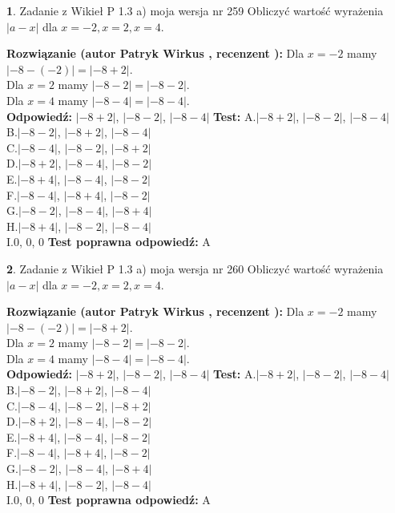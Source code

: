 \documentclass[12pt, a4paper]{article}
\theoremstyle{definition} %
\newtheorem{zad}{}
\newcommand{\zadStart}[1]{\begin{zad}#1\newline}
\newcommand{\zadStop}{\end{zad}}
\newcommand{\rozwStart}[2]{\noindent \textbf{Rozwiązanie (autor #1 , recenzent #2): }\newline}
\newcommand{\rozwStop}{\newline}
\newcommand{\odpStart}{\noindent \textbf{Odpowiedź:}\newline}
\newcommand{\odpStop}{\newline}
\newcommand{\testStart}{\noindent \textbf{Test:}\newline}
\newcommand{\testStop}{\newline}
\newcommand{\kluczStart}{\noindent \textbf{Test poprawna odpowiedź:}\newline}
\newcommand{\kluczStop}{\newline}
\begin{document}
\zadStart{Zadanie z Wikieł P 1.3 a) moja wersja nr 259}
Obliczyć wartość wyrażenia $|a - x|$ dla $x=-2,x=2,x=4$.
\zadStop
\rozwStart{Patryk Wirkus}{}
Dla $x = -2$ mamy $|-8 - (-2)| = |-8 + 2|$.\\
Dla $x = 2$ mamy $|-8 - 2| = |-8 - 2|$.\\
Dla $x = 4$ mamy $|-8 - 4| = |-8 - 4|$.\\
\rozwStop
\odpStart
$|-8 + 2|$, $|-8 - 2|$, $|-8 - 4|$
\odpStop
\testStart
A.$|-8 + 2|$, $|-8 - 2|$, $|-8 - 4|$\\
B.$|-8 - 2|$, $|-8 + 2|$, $|-8 - 4|$\\
C.$|-8 - 4|$, $|-8 - 2|$, $|-8 + 2|$\\
D.$|-8 + 2|$, $|-8 - 4|$, $|-8 - 2|$\\
E.$|-8 + 4|$, $|-8 - 4|$, $|-8 - 2|$\\
F.$|-8 - 4|$, $|-8 + 4|$, $|-8 - 2|$\\
G.$|-8 - 2|$, $|-8 - 4|$, $|-8 + 4|$\\
H.$|-8 + 4|$, $|-8 - 2|$, $|-8 - 4|$\\
I.$0$, $0$, $0$
\testStop
\kluczStart
A
\kluczStop



\zadStart{Zadanie z Wikieł P 1.3 a) moja wersja nr 260}
Obliczyć wartość wyrażenia $|a - x|$ dla $x=-2,x=2,x=4$.
\zadStop
\rozwStart{Patryk Wirkus}{}
Dla $x = -2$ mamy $|-8 - (-2)| = |-8 + 2|$.\\
Dla $x = 2$ mamy $|-8 - 2| = |-8 - 2|$.\\
Dla $x = 4$ mamy $|-8 - 4| = |-8 - 4|$.\\
\rozwStop
\odpStart
$|-8 + 2|$, $|-8 - 2|$, $|-8 - 4|$
\odpStop
\testStart
A.$|-8 + 2|$, $|-8 - 2|$, $|-8 - 4|$\\
B.$|-8 - 2|$, $|-8 + 2|$, $|-8 - 4|$\\
C.$|-8 - 4|$, $|-8 - 2|$, $|-8 + 2|$\\
D.$|-8 + 2|$, $|-8 - 4|$, $|-8 - 2|$\\
E.$|-8 + 4|$, $|-8 - 4|$, $|-8 - 2|$\\
F.$|-8 - 4|$, $|-8 + 4|$, $|-8 - 2|$\\
G.$|-8 - 2|$, $|-8 - 4|$, $|-8 + 4|$\\
H.$|-8 + 4|$, $|-8 - 2|$, $|-8 - 4|$\\
I.$0$, $0$, $0$
\testStop
\kluczStart
A
\kluczStop
\end{document}
